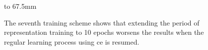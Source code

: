 \begin{figure}[p]
    \hbox to 67.5mm{}%
    \caption[The results of the seventh training scheme]{The seventh training scheme shows that extending the period of representation training to 10 epochs worsens the results when the regular learning process using \gls{ce} is resumed.}
    \label{fig:training_scheme_7}
\end{figure}

